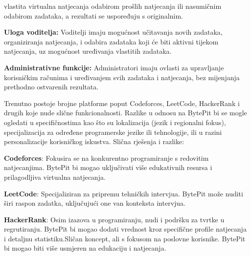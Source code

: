 \begin{packed_item}
		vlastita virtualna natjecanja odabirom prošlih natjecanja ili 
		nasumičnim odabirom zadataka, a rezultati se uspoređuju s originalnim.
    	\item \textbf{Uloga voditelja:} Voditelji imaju mogućnost učitavanja 
		novih zadataka, organiziranja natjecanja, i odabira zadataka koji će 
		biti aktivni tijekom natjecanja, uz mogućnost uređivanja vlastitih zadataka.
   		\item \textbf{Administrativne funkcije:} Administratori imaju ovlasti 
		za upravljanje korisničkim računima i uređivanjem svih zadataka i 
		natjecanja, bez mijenjanja prethodno ostvarenih rezultata.\\
		\end{packed_item}


		Trenutno postoje brojne platforme poput Codeforces, LeetCode,
		HackerRank i drugih koje nude slične funkcionalnosti. Razlike
		u odnosu na BytePit bi se mogle ogledati u specifičnostima kao
		što su lokalizacija (jezik i regionalni fokus), specijalizacija
		za određene programerske jezike ili tehnologije, ili u razini
		personalizacije korisničkog iskustva.
		Slična rješenja i razlike:
		\begin{packed_item}
			\item \textbf{Codeforces}: Fokusira se na konkurentno programiranje s
			redovitim natjecanjima. BytePit bi mogao uključivati više edukativnih
			resursa i prilagodljiva virtualna natjecanja.
			\item \textbf{LeetCode}: Specijaliziran za pripremu tehničkih intervjua.
			BytePit može nuditi širi raspon zadatka, uključujući one van konteksta intervjua.
			\item \textbf{HackerRank}: Osim izazova u programiranju, nudi i podršku
			za tvrtke u regrutiranju. BytePit bi mogao dodati vrednost kroz specifične
			profile natjecanja i detaljnu statistiku.Sličan koncept, ali s fokusom na
			poslovne korisnike. BytePit bi mogao biti više usmjeren na edukaciju i natjecanja.\\
		\end{packed_item}


